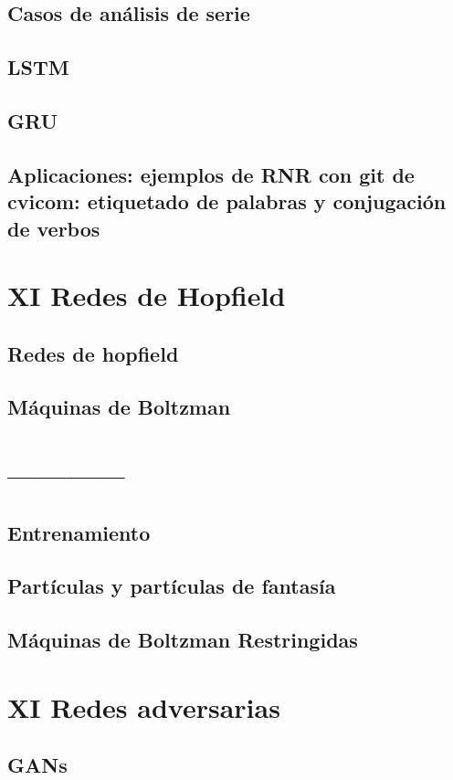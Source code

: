 \documentclass[12pt,openany]{book}
\begin{document}
\section{Casos de análisis de serie}
\section{LSTM}
\section{GRU}
\section{Aplicaciones: ejemplos de RNR con git de cvicom: etiquetado de palabras y conjugación de verbos}

\chapter{XI Redes de Hopfield}%
\section{Redes de hopfield}
\section{Máquinas de Boltzman}

\chapter{------------}%
\section{Entrenamiento}
\section{Partículas y partículas de fantasía}
\section{Máquinas de Boltzman Restringidas}

\chapter{XI Redes adversarias}%
\section{GANs}

\backmatter

\printbibliography[heading=bibintoc]
\end{document}
